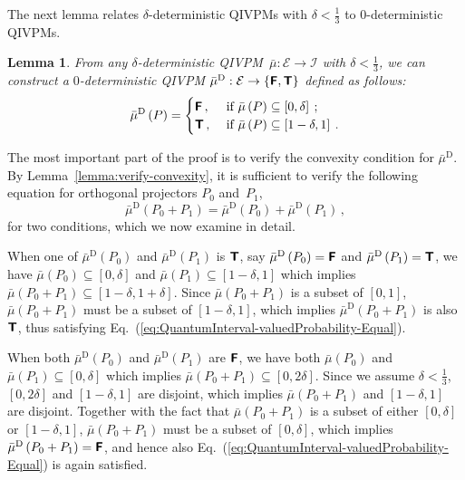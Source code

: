 \documentclass[english,reprint, aps, prl,superscriptaddress, showpacs,
showkeys, longbibliography, amsmath, amssymb, floatfix]{revtex4-1}
\theoremstyle{plain}
\newtheorem{lemma}{Lemma}
\theoremstyle{definition}
\newcommand{\events}{\ensuremath{\mathcal{E}}}
\newcommand{\imposs}{\textbf{\textsf{F}}}
\newcommand{\necess}{\textbf{\textsf{T}}}
\begin{document}
The next lemma relates $\delta$-deterministic QIVPMs with $\delta <
\frac{1}{3}$ to 0-deterministic QIVPMs. 

\begin{lemma}\label{lemma:delta2zero} 
  From any $\delta$-deterministic
  QIVPM~$\bar{\mu}:\events\rightarrow\mathscr{I}$ with
  $\delta < \frac{1}{3}$, we can construct a $0$-deterministic QIVPM
  $\bar{\mu}^{\textrm{D}}:\events\rightarrow\left\{
    \imposs,\necess\right\}$ defined as follows:
\begin{equation}
\bar{\mu}^{\textrm{D}}\left(P\right)=\begin{cases}
\imposs\,, & \textrm{ if }\bar{\mu}\left(P\right)\subseteq\left[0,\delta\right]\:;\\
\necess\,, & \textrm{ if }\bar{\mu}\left(P\right)\subseteq\left[1-\delta,1\right]\:.
\end{cases}
\end{equation}
\end{lemma}
\noindent The most important part of the proof is to verify the convexity
condition for $\bar{\mu}^{\textrm{D}}$. By Lemma~\ref{lemma:verify-convexity}, it is sufficient
to verify the following equation for orthogonal projectors $P_{0}$
and~$P_{1}$,
\begin{equation}
\bar{\mu}^{\textrm{D}}\left(P_{0}+P_{1}\right)=\bar{\mu}^{\textrm{D}}\left(P_{0}\right)+\bar{\mu}^{\textrm{D}}\left(P_{1}\right)\,, \label{eq:QuantumInterval-valuedProbability-Equal}
\end{equation}
for two conditions, which we now examine in detail.

When one of $\bar{\mu}^{\textrm{D}}\left(P_{0}\right)$ and $\bar{\mu}^{\textrm{D}}\left(P_{1}\right)$
is $\necess$, say $\bar{\mu}^{\textrm{D}}\left(P_{0}\right)=\imposs$
and $\bar{\mu}^{\textrm{D}}\left(P_{1}\right)=\necess$, we have $\bar{\mu}\left(P_{0}\right)\subseteq\left[0,\delta\right]$
and $\bar{\mu}\left(P_{1}\right)\subseteq\left[1-\delta,1\right]$ which
implies $\bar{\mu}\left(P_{0}+P_{1}\right)\subseteq\left[1-\delta,1+\delta\right]$.
Since $\bar{\mu}\left(P_{0}+P_{1}\right)$ is a subset of $\left[0,1\right]$,
$\bar{\mu}\left(P_{0}+P_{1}\right)$ must be a subset of $\left[1-\delta,1\right]$,
which implies $\bar{\mu}^{\textrm{D}}\left(P_{0}+P_{1}\right)$ is also
$\necess$, thus satisfying Eq.~(\ref{eq:QuantumInterval-valuedProbability-Equal}).

When both
$\bar{\mu}^{\textrm{D}}\left(P_{0}\right)$ and $\bar{\mu}^{\textrm{D}}\left(P_{1}\right)$
are $\imposs$, we have both $\bar{\mu}\left(P_{0}\right)$ and
$\bar{\mu}\left(P_{1}\right)\subseteq\left[0,\delta\right]$ which
implies
$\bar{\mu}\left(P_{0}+P_{1}\right)\subseteq\left[0,2\delta\right]$.
Since we assume $\delta<\frac{1}{3}$, $\left[0,2\delta\right]$ and
$\left[1-\delta,1\right]$ are disjoint, which implies
$\bar{\mu}\left(P_{0}+P_{1}\right)$ and $\left[1-\delta,1\right]$ are
disjoint. Together with the fact that
$\bar{\mu}\left(P_{0}+P_{1}\right)$ is a subset of either
$\left[0,\delta\right]$ or $\left[1-\delta,1\right]$,
$\bar{\mu}\left(P_{0}+P_{1}\right)$ must be a subset of
$\left[0,\delta\right]$, which implies
$\bar{\mu}^{\textrm{D}}\left(P_{0}+P_{1}\right)=\imposs$, and hence
also Eq.~(\ref{eq:QuantumInterval-valuedProbability-Equal}) is again satisfied.
\end{document}
